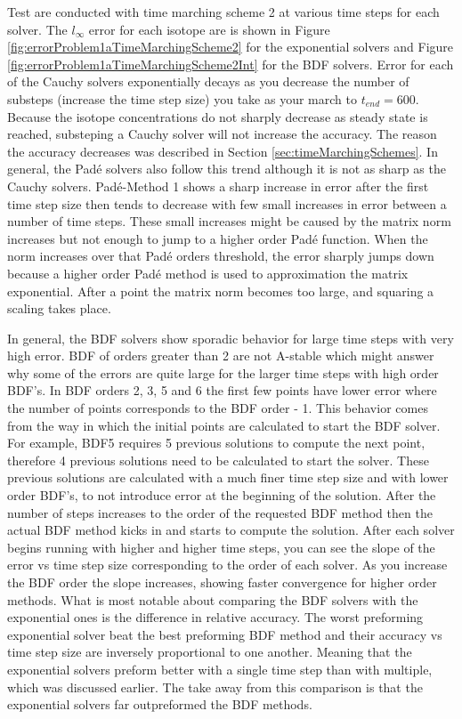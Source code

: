Test are conducted with time marching scheme 2 at various time steps for each solver. The $l_{\infty}$ error for each isotope are is shown in Figure \ref{fig:errorProblem1aTimeMarchingScheme2} for the exponential solvers and Figure \ref{fig:errorProblem1aTimeMarchingScheme2Int} for the BDF solvers. Error for each of the Cauchy solvers exponentially decays as you decrease the number of substeps (increase the time step size) you take as your march to $t_{end}=600$. Because the isotope concentrations do not sharply decrease as steady state is reached, substeping a Cauchy solver will not increase the accuracy. The reason the accuracy decreases was described in Section \ref{sec:timeMarchingSchemes}. In general, the Pad\'e solvers also follow this trend although it is not as sharp as the Cauchy solvers. Pad\'e-Method 1 shows a sharp increase in error after the first time step size then tends to decrease with few small increases in error between a number of time steps. These small increases might be caused by the matrix norm increases but not enough to jump to a higher order Pad\'e function. When the norm increases over that Pad\'e orders threshold, the error sharply jumps down because a higher order Pad\'e method is used to approximation the matrix exponential. After a point the matrix norm becomes too large, and squaring a scaling takes place. 

In general, the BDF solvers show sporadic behavior for large time steps with very high error. BDF of orders greater than 2 are not A-stable which might answer why some of the errors are quite large for the larger time steps with high order BDF's. In BDF orders 2, 3, 5 and 6 the first few points have lower error where the number of points corresponds to the BDF order - 1. This behavior comes from the way in which the initial points are calculated to start the BDF solver. For example, BDF5 requires 5 previous solutions to compute the next point, therefore 4 previous solutions need to be calculated to start the solver. These previous solutions are calculated with a much finer time step size and with lower order BDF's, to not introduce error at the beginning of the solution. After the number of steps increases to the order of the requested BDF method then the actual BDF method kicks in and starts to compute the solution. After each solver begins running with higher and higher time steps, you can see the slope of the error vs time step size corresponding to the order of each solver. As you increase the BDF order the slope increases, showing faster convergence for higher order methods. What is most notable about comparing the BDF solvers with the exponential ones is the difference in relative accuracy. The worst preforming exponential solver beat the best preforming BDF method and their accuracy vs time step size are inversely proportional to one another. Meaning that the exponential solvers preform better with a single time step than with multiple, which was discussed earlier. The take away from this comparison is that the exponential solvers far outpreformed the BDF methods. 

